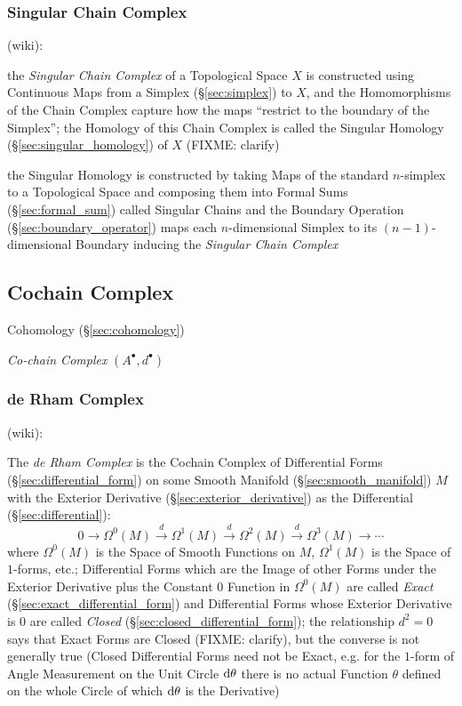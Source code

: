 \subsubsection{Singular Chain Complex}\label{sec:singular_chain_complex}

(wiki):

the \emph{Singular Chain Complex} of a Topological Space $X$ is constructed
using Continuous Maps from a Simplex (\S\ref{sec:simplex}) to $X$, and the
Homomorphisms of the Chain Complex capture how the maps ``restrict to the
boundary of the Simplex''; the Homology of this Chain Complex is called the
Singular Homology (\S\ref{sec:singular_homology}) of $X$ (FIXME: clarify)

the Singular Homology is constructed by taking Maps of the standard $n$-simplex
to a Topological Space and composing them into Formal
Sums (\S\ref{sec:formal_sum}) called Singular Chains and the Boundary Operation
(\S\ref{sec:boundary_operator}) maps each $n$-dimensional Simplex to its
$(n-1)$-dimensional Boundary inducing the \emph{Singular Chain Complex}



\subsection{Cochain Complex}\label{sec:cochain_complex}

\fist Cohomology (\S\ref{sec:cohomology})

\emph{Co-chain Complex} $(A^\bullet, d^\bullet)$



\subsubsection{de Rham Complex}\label{sec:derham_complex}

(wiki):

The \emph{de Rham Complex} is the Cochain Complex of Differential Forms
(\S\ref{sec:differential_form}) on some Smooth Manifold
(\S\ref{sec:smooth_manifold}) $M$ with the Exterior Derivative
(\S\ref{sec:exterior_derivative}) as the Differential
(\S\ref{sec:differential}):
\[
  0 \rightarrow \Omega^0(M) \xrightarrow{d} \Omega^1(M) \xrightarrow{d}
  \Omega^2(M) \xrightarrow{d} \Omega^3(M) \rightarrow \cdots
\]
where $\Omega^0(M)$ is the Space of Smooth Functions on $M$, $\Omega^1(M)$ is
the Space of $1$-forms, etc.; Differential Forms which are the Image of other
Forms under the Exterior Derivative plus the Constant $0$ Function in
$\Omega^0(M)$ are called \emph{Exact} (\S\ref{sec:exact_differential_form}) and
Differential Forms whose Exterior Derivative is $0$ are called \emph{Closed}
(\S\ref{sec:closed_differential_form}); the relationship $d^2 = 0$ says that
Exact Forms are Closed (FIXME: clarify), but the converse is not generally true
(Closed Differential Forms need not be Exact, e.g. for the $1$-form of Angle
Measurement on the Unit Circle $\mathrm{d}\theta$ there is no actual Function
$\theta$ defined on the whole Circle of which $\mathrm{d}\theta$ is the
Derivative)

